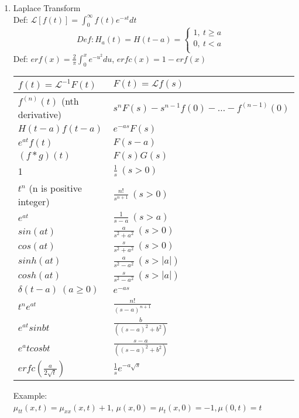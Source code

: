 \documentclass[10pt]{article}
\newcommand{\Lap}{\mathcal{L}}
\begin{document}
\begin{multicols}{2}
\begin{enumerate}
	\item Laplace Transform\\
	Def: $\Lap[f(t)] = \int_{0}^{\infty}f(t)e^{-st}dt$\\
	\begin{equation}
	Def: H_a(t) = H(t-a) = 
	\left\{
	\begin{array}{lr}
	1, \ t \ge a&\\
	0, \ t < a\\
	\end{array}
	\right.
	\end{equation}
	Def: $erf(x) = \frac{2}{\pi} \int_{0}^{x} e^{-u^2}du$, $erfc(x) = 1-erf(x)$
	\begin{center}
		\begin{tabular}{|l l|} \hline
		$f(t) = \Lap^{-1}F (t)$		& $F (t) = \Lap f(s)$ \\ \hline
		$f^{(n)}(t)$ (nth derivative)	& $s^n F(s)-s^{n-1}f(0) - \dots - f^{(n-1)}(0)$  \\
		$H(t-a)f(t-a)$	& $e^{-as}F(s)$ \\
		$e^{at}f(t)$	& $F(s-a)$ \\
		$(f*g)(t)$ 		& $F(s)G(s)$ \\
		1 				& $\frac{1}{s} \ (s > 0)$ \\
		$t^n$ (n is positive integer) & $\frac{n!}{s^{n+1}} \ (s>0) $\\
		$e^{at}$ 			& $ \frac{1}{s-a} \ (s > a)$ \\
		$sin(at)$ 		& $\frac{a}{s^2+a^2} \ (s > 0)$ \\
		$cos(at)$		& $\frac{s}{s^2+a^2} \ (s > 0)$ \\
		$sinh(at)$		& $\frac{a}{s^2-a^2} \ (s > |a|)$ \\
		$cosh(at)$		& $\frac{s}{s^2-a^2} \ (s > |a|)$ \\
		$\delta(t-a) \ (a \ge 0)$ & $e^{-as}$ \\
		$t^ne^{at}$ 	& $\frac{n!}{(s-a)^{n+1}}$ \\
		$e^{at}sinbt$ 	& $\frac{b}{((s-a)^2 + b^2)}$ \\
		$e^atcosbt$		& $\frac{s-a}{((s-a)^2 + b^2)}$ \\
		$erfc(\frac{a}{2 \sqrt{t} })$ & $\frac{1}{s} e^{-a \sqrt{s} }$ \\ \hline
		\end{tabular}
	\end{center}
	Example:\\
	$\mu_{tt}(x,t) = \mu_{xx}(x,t) + 1$, $\mu(x,0) = \mu_t(x,0) = -1, \mu(0,t) = t$\\

\end{enumerate}
\end{multicols}
\end{document}
